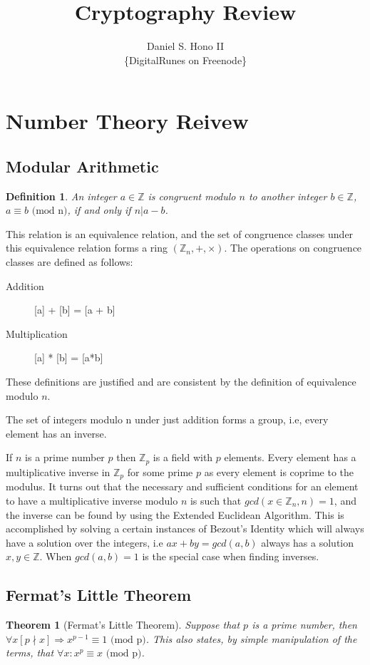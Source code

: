 \documentclass[12pt,a4paper]{article}
\author{Daniel S. Hono II \\ \{DigitalRunes on Freenode\}}
\title{Cryptography Review}
\newtheorem{thm}{Theorem}
\newtheorem{mydef}{Definition}
\begin{document}
\maketitle
\pagebreak

\section{Number Theory Reivew}

\subsection{Modular Arithmetic}
\begin{mydef}
An integer $a \in \mathbb{Z}$ is congruent modulo $n$ to another integer $b \in \mathbb{Z}$, $a \equiv b \text{ (mod n)}$, if and only if $n | a - b$. 
\end{mydef}
This relation is an equivalence relation, and the set of congruence classes under this equivalence relation forms a ring $\left( \mathbb{Z}_{n}, +, \times \right)$. The operations on congruence classes are defined as follows:
\begin{description}
	\item[Addition] [a] + [b] = [a + b] 
	\item[Multiplication] [a] * [b] = [a*b]
\end{description}
These definitions are justified and are consistent by the definition of equivalence modulo $n$. 

The set of integers modulo n under just addition forms a group, i.e, every element has an inverse. 

If $n$ is a prime number $p$ then $\mathbb{Z}_p$ is a field with $p$ elements. Every element has a multiplicative inverse in $\mathbb{Z}_{p}$ for some prime $p$  as every element is coprime to the modulus. It turns out that the necessary and sufficient conditions for an element to have a multiplicative inverse modulo $n$ is such that $gcd(x \in \mathbb{Z}_{n}, n) = 1$, and the inverse can be found by using the Extended Euclidean Algorithm. This is accomplished by solving a certain instances of Bezout's Identity which will always have a solution over the integers, i.e $ax + by = gcd(a, b)$ always has a solution $x, y \in \mathbb{Z}$. When $gcd(a, b) = 1$ is the special case when finding inverses. 


\subsection{Fermat's Little Theorem}
\begin{thm}[Fermat's Little Theorem]
Suppose that $p$ is a prime number, then $\forall x[p \nmid x]  \Rightarrow x^{p-1} \equiv 1 \text{ (mod p)}$. This also states,  by simple manipulation of the terms, that $\forall x: x^{p} \equiv x \text{ (mod p)}$. 
\end{thm}
\end{document}
